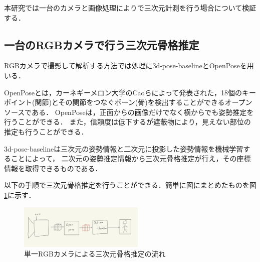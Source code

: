 \documentclass[titlepage]{jarticle}
\begin{document}
本研究では一台のカメラと画像処理によりで三次元計測を行う場合について検証する．

%
%
\subsection{一台のRGBカメラで行う三次元骨格推定}
%
RGBカメラで撮影して解析する方法では処理に3d-pose-baseline\cite{baseline}とOpenPose\cite{openpose}を用いる．

OpenPoseとは，カーネギーメロン大学のCaoらによって発表された，18個のキーポイント(関節)とその関節をつなぐボーン(骨)を検出することができるオープンソースである．
OpenPoseは，正面からの画像だけでなく横からでも姿勢推定を行うことができる．
また，信頼度は低下するが遮蔽物により，見えない部位の推定も行うことができる．

3d-pose-baselineは三次元の姿勢情報と二次元に投影した姿勢情報を機械学習することによって，
二次元の姿勢推定情報から三次元骨格推定が行え，その座標情報を取得できるものである．

以下の手順で三次元骨格推定を行う\cite{ビデオ}ことができる．簡単に図にまとめたものを図\ref{RGB}に示す．

\begin{figure}[t!]
  \centering
  \includegraphics[width=6cm]{img/RGBcamera.jpg}
  \caption{単一RGBカメラによる三次元骨格推定の流れ}
  \label{RGB}
\end{figure}
\end{document}
